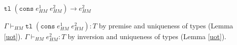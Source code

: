 \begin{case}
$\mathtt{tl}\;(\mathtt{cons}\;e_{HM}^{1}\;e_{HM}^{2})\rightarrow e_{HM}^{2}$

$\Gamma\vdash_{HM}\mathtt{tl}\;(\mathtt{cons}\;e_{HM}^{1}\;e_{HM}^{2}):T$ by premise and uniqueness of types (Lemma \ref{uot}).  $\Gamma\vdash_{HM}e_{HM}^{2}:T$ by inversion and uniqueness of types (Lemma \ref{uot}).
\end{case}